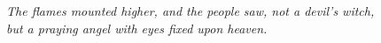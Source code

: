 \documentclass[b6paper]{scrbook}
\begin{document}
\begin{figure}[htbp]
	\linethickness{2pt}
	\centering%
	\caption{\textit{The flames mounted higher, and the people saw, not a devil’s witch, but a praying angel with eyes fixed upon heaven.}}
\end{figure}





\backmatter


\end{document}
